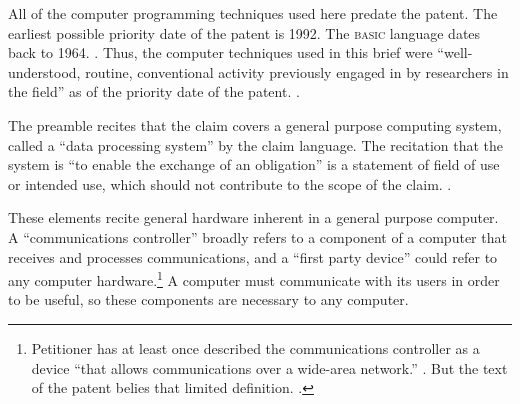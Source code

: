 \documentclass{scotus}
\begin{document}
All of the computer programming techniques used here predate the patent.
The earliest
possible priority date of the patent is 1992. The \textsc{basic} language dates
back to 1964. . Thus,
the computer techniques used in this brief were
``well-understood, routine, conventional activity
previously engaged in by researchers in the field'' as of the priority date of
the patent. .


The preamble recites that the claim covers a general purpose computing system,
called a ``data processing system'' by the claim language. The recitation that
the system is ``to enable the exchange of an obligation'' is a statement of
field of use or intended use, which should not contribute to the scope of the
claim.
.


These elements recite general hardware inherent in a general purpose computer. A
``communications controller'' broadly refers to a component of a computer that
receives and processes communications, and a ``first party device'' could refer
to any computer hardware.\footnote{Petitioner has at least once
described the communications controller as a device ``that allows communications
over a wide-area network.'' . But the text of the
patent belies that limited definition. .} A computer must communicate with its users in order to be useful,
so these components are necessary to any computer.

\end{document}
